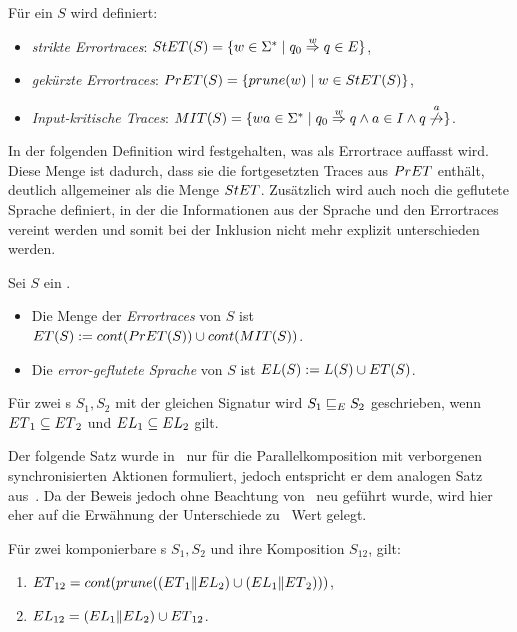 \begin{Def}[Errortraces]
\label{DefErrortraces}
  Für ein \EIO{} $S$ wird definiert:
  \begin{itemize}
    \item \emph{strikte Errortraces}: $StET{}(S)=\{w\in\Sigma
      ^*\mid q_0\overset{w}{\Rightarrow}q\in E\}$,
    \item \emph{gekürzte Errortraces}: $PrET{}(S)=\{prune{}(w)\mid w\in StET{}(S)\}$,
    \item \emph{Input-kritische Traces}: $\MIT{}(S)=\{wa\in\Sigma ^*\mid
      q_0\overset{w}{\Rightarrow}q\wedge a\in I\wedge
    q\overset{a}{\not{\hspace{-0.1cm}\rightarrow}}\}$.
  \end{itemize}
\end{Def}

In der folgenden Definition wird festgehalten, was als Errortrace auffasst
wird. Diese Menge ist dadurch, dass sie die fortgesetzten Traces aus $PrET{}$
enthält, deutlich allgemeiner als die Menge $StET{}$. Zusätzlich wird auch noch
die geflutete Sprache definiert, in der die Informationen aus der Sprache und den
Errortraces vereint werden und somit bei der Inklusion nicht mehr explizit
unterschieden werden.

\begin{Def}
\label{DefETEL}
  Sei $S$ ein \EIO{}.
  \begin{itemize}
    \item Die Menge der \emph{Errortraces} von $S$ ist $ET{}(S):=cont{}(PrET{}(S))\cup
      cont{}(MIT{}(S))$.
    \item Die \emph{error-geflutete Sprache} von $S$ ist $EL{}(S):=L(S)\cup ET{}(S)$.
  \end{itemize}
  Für zwei \EIO{}s $S_1, S_2$ mit der gleichen Signatur wird
  $S_1\sqsubseteq _E S_2$ geschrieben, wenn $ET{}_1\subseteq ET{}_2$ und
  $EL{}_1\subseteq EL{}_2$ gilt.
\end{Def}

Der folgende Satz wurde in~\cite{Vogler2014EIO} nur für die Parallelkomposition
mit verborgenen synchronisierten Aktionen formuliert, jedoch entspricht er dem
analogen Satz aus~\cite{Schlosser2012BA}. Da der Beweis jedoch ohne Beachtung
von~\cite{Schlosser2012BA} neu geführt wurde, wird hier eher auf die
Erwähnung der Unterschiede zu~\cite{Vogler2014EIO} Wert gelegt.

\begin{satz}
\label{satzErrorSemanik}
  Für zwei komponierbare \EIO{}s $S_1, S_2$ und ihre Komposition
  $S_{12}$, gilt:
  \begin{enumerate}
    \item
      $ET{}_{12}=cont{}(prune{}((ET{}_1\|EL{}_2)\cup(EL{}_1\|ET{}_2)))$,
    \item $EL{}_{12}=(EL{}_1\|EL{}_2)\cup ET{}_{12}$.
  \end{enumerate}
\end{satz}

